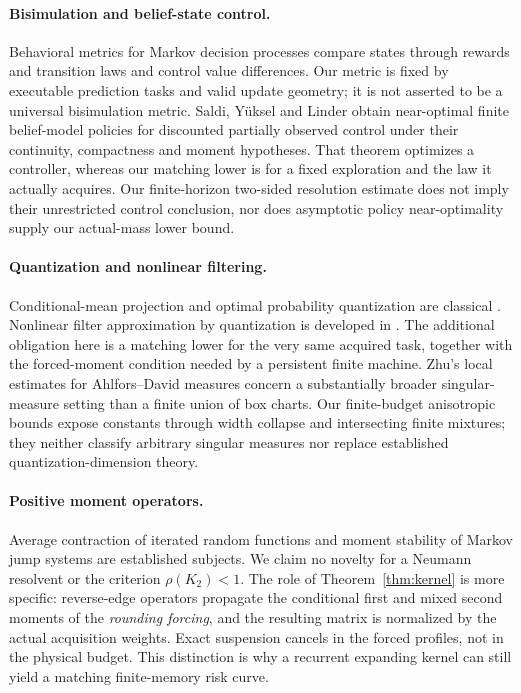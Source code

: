 \paragraph{Bisimulation and belief-state control.}
Behavioral metrics for Markov decision processes \cite{ferns} compare states through rewards and transition laws and control value differences. Our metric is fixed by executable prediction tasks and valid update geometry; it is not asserted to be a universal bisimulation metric. Saldi, Y\"uksel and Linder \cite[Assumption 1 and Theorem 3]{saldi} obtain near-optimal finite belief-model policies for discounted partially observed control under their continuity, compactness and moment hypotheses. That theorem optimizes a controller, whereas our matching lower is for a fixed exploration and the law it actually acquires. Our finite-horizon two-sided resolution estimate does not imply their unrestricted control conclusion, nor does asymptotic policy near-optimality supply our actual-mass lower bound.

\paragraph{Quantization and nonlinear filtering.}
Conditional-mean projection and optimal probability quantization are classical \cite{graf}. Nonlinear filter approximation by quantization is developed in \cite{pages,sellami,feuer}. The additional obligation here is a matching lower for the very same acquired task, together with the forced-moment condition needed by a persistent finite machine. Zhu's local estimates for Ahlfors--David measures \cite[Theorem 1.1]{zhu} concern a substantially broader singular-measure setting than a finite union of box charts. Our finite-budget anisotropic bounds expose constants through width collapse and intersecting finite mixtures; they neither classify arbitrary singular measures nor replace established quantization-dimension theory.

\paragraph{Positive moment operators.}
Average contraction of iterated random functions \cite{diaconis} and moment stability of Markov jump systems \cite{costa} are established subjects. We claim no novelty for a Neumann resolvent or the criterion $\rho(K_2)<1$. The role of Theorem~\ref{thm:kernel} is more specific: reverse-edge operators propagate the conditional first and mixed second moments of the \emph{rounding forcing}, and the resulting matrix is normalized by the actual acquisition weights. Exact suspension cancels in the forced profiles, not in the physical budget. This distinction is why a recurrent expanding kernel can still yield a matching finite-memory risk curve.

